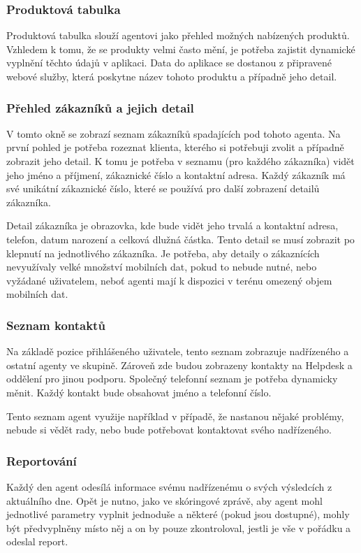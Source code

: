 \documentclass[11pt,twoside,a4paper]{book}
\begin{document}
\subsubsection{Produktová tabulka}
Produktová tabulka slouží agentovi jako přehled možných nabízených produktů. Vzhledem k tomu, že se produkty velmi často mění, je potřeba zajistit dynamické vyplnění těchto údajů v aplikaci. Data do aplikace se dostanou z připravené webové služby, která poskytne název tohoto produktu a případně jeho detail. 

\subsubsection{Přehled zákazníků a jejich detail}
V tomto okně se zobrazí seznam zákazníků spadajících pod tohoto agenta. Na první pohled je potřeba rozeznat klienta, kterého si potřebuji zvolit a případně zobrazit jeho detail. K tomu je potřeba v seznamu (pro každého zákazníka) vidět jeho jméno a příjmení, zákaznické číslo a kontaktní adresa. Každý zákazník má své unikátní zákaznické číslo, které se používá pro další zobrazení detailů zákazníka.

Detail zákazníka je obrazovka, kde bude vidět jeho trvalá a kontaktní adresa, telefon, datum narození a celková dlužná částka. Tento detail se musí zobrazit po klepnutí na jednotlivého zákazníka. Je potřeba, aby detaily o zákaznících nevyužívaly velké množství mobilních dat, pokud to nebude nutné, nebo vyžádané uživatelem, neboť agenti mají k dispozici v terénu omezený objem mobilních dat.

\subsubsection{Seznam kontaktů}
Na základě pozice přihlášeného uživatele, tento seznam zobrazuje nadřízeného a ostatní agenty ve skupině. Zároveň zde budou zobrazeny kontakty na Helpdesk a oddělení pro jinou podporu. Společný telefonní seznam je potřeba dynamicky měnit. Každý kontakt bude obsahovat jméno a telefonní číslo.

Tento seznam agent využije například v případě, že nastanou nějaké problémy, nebude si vědět rady, nebo bude potřebovat kontaktovat svého nadřízeného.

\subsubsection{Reportování}
Každý den agent odesílá informace svému nadřízenému o svých výsledcích z aktuálního dne. Opět je nutno, jako ve skóringové zprávě, aby agent mohl jednotlivé parametry vyplnit jednoduše a některé (pokud jsou dostupné), mohly být předvyplněny místo něj a on by pouze zkontroloval, jestli je vše v pořádku a odeslal report.
\end{document}
